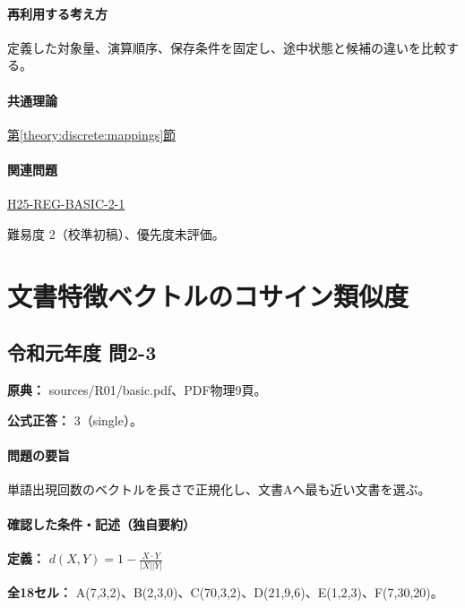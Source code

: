 \paragraph{再利用する考え方} 定義した対象量、演算順序、保存条件を固定し、途中状態と候補の違いを比較する。

\paragraph{共通理論} \hyperref[theory:discrete:mappings]{第\ref*{theory:discrete:mappings}節}

\paragraph{関連問題} \hyperref[q:h25-reg-basic-2-1]{H25-REG-BASIC-2-1}

\par 難易度 2（校準初稿）、優先度未評価。

\section{文書特徴ベクトルのコサイン類似度}

\subsection{令和元年度 問2-3}
\label{q:r01-reg-basic-2-3}

\noindent\textbf{原典：} sources/R01/basic.pdf、PDF物理9頁。

\textbf{公式正答：} 3（single）。

\paragraph{問題の要旨} 単語出現回数のベクトルを長さで正規化し、文書Aへ最も近い文書を選ぶ。

\paragraph{確認した条件・記述（独自要約）}\mbox{}\par

\noindent\textbf{定義：} \(d(X,Y)=1-\frac{X\cdot Y}{|X||Y|}\)\par

\noindent\textbf{全18セル：} A(7,3,2)、B(2,3,0)、C(70,3,2)、D(21,9,6)、E(1,2,3)、F(7,30,20)。\par

